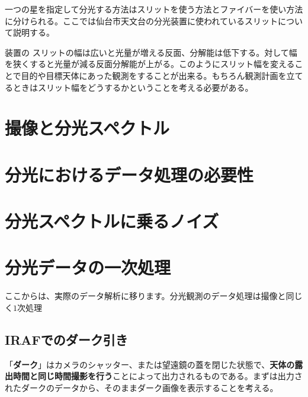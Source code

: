     
    一つの星を指定して分光する方法はスリットを使う方法とファイバーを使い方法に分けられる。ここでは仙台市天文台の分光装置に使われているスリットについて説明する。
    
    装置の
    スリットの幅は広いと光量が増える反面、分解能は低下する。対して幅を狭くすると光量が減る反面分解能が上がる。このようにスリット幅を変えることで目的や目標天体にあった観測をすることが出来る。もちろん観測計画を立てるときはスリット幅をどうするかということを考える必要がある。
    
    
\section{撮像と分光スペクトル}
\label{sec_4_3}
    
\section{分光におけるデータ処理の必要性}
\label{sec_4_4}
    
\section{分光スペクトルに乗るノイズ}
\label{sec_4_5}
    
\section{分光データの一次処理}
\label{sec_4_6}
ここからは、実際のデータ解析に移ります。分光観測のデータ処理は撮像と同じく$1$次処理

\subsection{IRAFでのダーク引き}
\label{subsec_4_6_1}
「\textbf{ダーク}」はカメラのシャッター、または望遠鏡の蓋を閉じた状態で、\textbf{天体の露出時間と同じ時間撮影を行う}ことによって出力されるものである。まずは出力されたダークのデータから、そのままダーク画像を表示することを考える。
    
